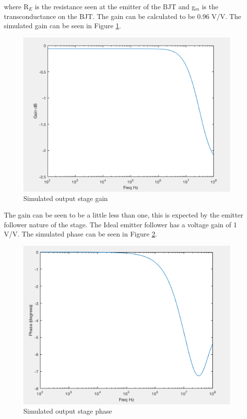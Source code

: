 where R$_E$ is the resistance seen at the emitter of the BJT and g$_m$ is the transconductance on the  BJT. The gain can be calculated to be 0.96 V/V. The simulated gain can be seen in Figure \ref{fig:outputgain}.

\begin{figure}[H]
	\begin{center}
		\includegraphics[scale=.40]{Simulations/gainlaststage.png}
		\caption{Simulated output stage gain}
		\label{fig:outputgain}
	\end{center}
\end{figure} 

The gain can be seen to be a little less than one, this is expected by the emitter follower nature of the stage. The Ideal emitter follower has a voltage gain of 1 V/V. The simulated phase can be seen in Figure \ref{fig:outputphase}.

\begin{figure}[H]
	\begin{center}
		\includegraphics[scale=.40]{Simulations/phaselaststage.png}
		\caption{Simulated output stage phase}
		\label{fig:outputphase}
	\end{center}
\end{figure} 

